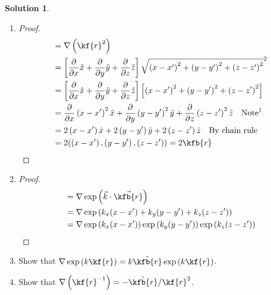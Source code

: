 \documentclass[10pt]{article}
\theoremstyle{definition}
\newtheorem{soln}{Solution}
\newcommand{\ux}{\hat{x}}
\newcommand{\uy}{\hat{y}}
\newcommand{\uz}{\hat{z}}
\newcommand{\primed}[1]{#1^\prime}
\newcommand{\scriptr}{\kf{r}}
\newcommand{\bscriptr}{\kfb{r}}
\begin{document}
\begin{soln} ~
  \begin{enumerate}[label=(\alph*)]
    \item \begin{proof}
            \begin{align*}
               & =\nabla\left(\scriptr^2\right)                                                                                                                                                                                     \\
               & =\left[\frac{\partial}{\partial x}\ux + \frac{\partial}{\partial y}\uy + \frac{\partial}{\partial z}\uz \right]\sqrt{\left(x-\primed{x}\right)^2 + \left(y-\primed{y}\right)^2+ \left(z-\primed{z}\right)^2}^2     \\
               & =\left[\frac{\partial}{\partial x}\ux + \frac{\partial}{\partial y}\uy + \frac{\partial}{\partial z}\uz \right]\left[\left(x-\primed{x}\right)^2 + \left(y-\primed{y}\right)^2+ \left(z-\primed{z}\right)^2\right] \\
               & =\frac{\partial}{\partial x}\left(x-\primed{x}\right)^2\ux + \frac{\partial}{\partial y} \left(y-\primed{y}\right)^2\uy + \frac{\partial}{\partial z}\left(z-\primed{z}\right)^2\uz \quad \text{Note\footnotemark} \\
               & =2\left(x-\primed{x}\right)\ux + 2\left(y-\primed{y}\right)\uy+2\left(z-\primed{z}\right)\uz \quad \text{By chain rule}                                                                                            \\
               & =2(\left(x-\primed{x}\right),\left(y-\primed{y}\right),\left(z-\primed{z}\right)) = 2\bscriptr\qedhere
            \end{align*}
          \end{proof}
    \item \begin{proof}
            \begin{align*}
               & =  \nabla\exp\left(\vec{k}\cdot\vec{\bscriptr}\right)                                                             \\
               & =  \nabla\exp\left(k_x(x-\primed{x})+k_y(y-\primed{y})+k_z(z-\primed{z})\right)                                   \\
               & =  \nabla\exp\left(k_x(x-\primed{x})\right) \exp\left(k_y(y-\primed{y})\right) \exp\left(k_z(z-\primed{z})\right) \\
            \end{align*}
          \end{proof}
    \item Show that $\nabla\exp\left(k\scriptr\right)=k\hat{\bscriptr}\exp\left(k\scriptr\right)$.
    \item Show that $\nabla \left(\scriptr^{-1}\right)=-\hat{\bscriptr}/\scriptr^2$.
  \end{enumerate}
\end{soln}
\end{document}
